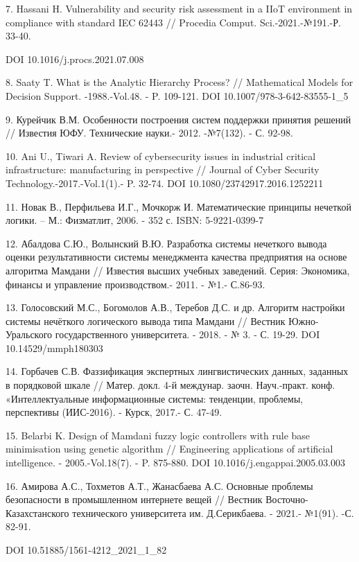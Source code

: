 \documentclass[
]{article}
\begin{document}
7. Hassani H. Vulnerability and security risk assessment in a IIoT
environment in compliance with standard IEC 62443 // Procedia Comput.
Sci.-2021.-№191.-Р. 33-40.

DOI 10.1016/j.procs.2021.07.008

8. Saaty T. What is the Analytic Hierarchy Process? // Mathematical
Models for Decision Support. -1988.-Vol.48. - P. 109-121. DOI
10.1007/978-3-642-83555-1\_5

9. Курейчик В.М. Особенности построения систем поддержки принятия
решений // Известия ЮФУ. Технические науки.- 2012. -№7(132). - С. 92-98.

10. Ani U., Tiwari A. Review of cybersecurity issues in industrial
critical infrastructure: manufacturing in perspective // Journal of
Cyber Security Technology.-2017.-Vol.1(1).- P. 32-74. DOI
10.1080/23742917.2016.1252211

11. Новак В., Перфильева И.Г., Мочкорж И. Математические принципы
нечеткой логики. -- М.: Физматлит, 2006. - 352 с. ISBN: 5-9221-0399-7

12. Абалдова С.Ю., Волынский В.Ю. Разработка системы нечеткого вывода
оценки результативности системы менеджмента качества предприятия на
основе алгоритма Мамдани // Известия высших учебных заведений. Серия:
Экономика, финансы и управление производством.- 2011. - №1.- С.86-93.

13. Голосовский М.С., Богомолов А.В., Теребов Д.С. и др. Алгоритм
настройки системы нечёткого логического вывода типа Мамдани // Вестник
Южно-Уральского государственного университета. - 2018. - № 3. - С.
19-29. DOI 10.14529/mmph180303

14. Горбачев С.В. Фаззификация экспертных лингвистических данных,
заданных в порядковой шкале // Матер. докл. 4-й междунар. заочн.
Науч.-практ. конф. «Интеллектуальные информационные системы: тенденции,
проблемы, перспективы (ИИС-2016). - Курск, 2017.- С. 47-49.

15. Belarbi K. Design of Mamdani fuzzy logic controllers with rule base
minimisation using genetic algorithm // Engineering applications of
artificial intelligence. - 2005.-Vol.18(7). - P. 875-880. DOI
10.1016/j.engappai.2005.03.003

16. Амирова А.С., Тохметов А.Т., Жанасбаева А.С. Основные проблемы
безопасности в промышленном интернете вещей // Вестник
Восточно-Казахстанского технического университета им. Д.Серикбаева. -
2021.- №1(91). -С. 82-91.

DOI 10.51885/1561-4212\_2021\_1\_82
\end{document}
